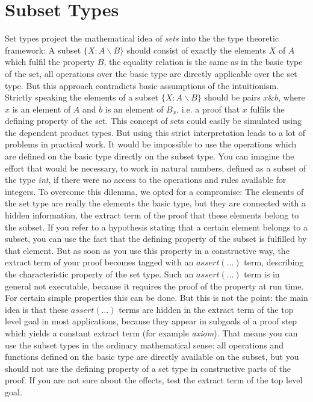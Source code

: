 \documentclass[11pt]{report}
\newcommand{\inv}[1]{\index{#1}}
\begin{document}
 \section{Subset Types}
 \inv{subset type}
  
 Set types project the mathematical idea of \emph{sets} into the
 the type theoretic framework: A subset $\{X:A\backslash B\}$ 
 should consist of exactly the elements $X$ of $A$ which
 fulfil the property $B$, the equality relation is the same as in
 the basic type of the set, all operations over the basic type are
 directly applicable over the set type.
 But this approach contradicts basic assumptions of the 
 intuitionism. 
 Strictly speaking the elements of a subset 
 $\{X:A\backslash B\}$ should be pairs $x\&b$, where $x$ is an
 element of $A$ and $b$ is an element of $B_x$, i.e. a proof
 that $x$ fulfils the defining property of the set.
 This concept of sets could easily be simulated using the
 dependent product types.
 But using this strict interpretation leads to a lot of problems
 in practical work. It would be impossible to use the
 operations which are defined on the basic type directly on the
 subset type. You can imagine the effort that would be necessary,
 to work in natural numbers, defined as a subset of the type \emph{int},
 if there were no access to the operations and rules 
 available for integers. 
 To overcome this dilemma, we opted for a compromise:
 The elements of the set type are really the elements the
 basic type, but they are connected with a hidden information,
 the extract term of the proof that these elements belong to  
 the subset. If you refer to a hypothesis stating that a
 certain element belongs to a subset, you can use the fact that
 the defining property of the subset is fulfilled by that
 element. But as soon as you use this property in a constructive
 way, the extract term of your proof becomes tagged with an
 $assert(...)$ term, describing the characteristic property
 of the set type. Such an $assert(...)$ term is in general
 not executable, because it requires the proof of the property
 at run time. For certain simple properties this can be done.
 But this is not the point: the main idea is that 
 these $assert(...)$ terms are hidden in the
 extract term of the top level goal in most applications, because
 they appear in subgoals of a proof step which yields a constant
 extract term (for example \emph{axiom}).
 That means you can use the subset types in the ordinary mathematical
 sense: all operations and functions defined on the basic type
 are directly available on the subset, but you should not use the
 defining property of a set type in constructive parts of the
 proof. If you are not sure about the effects, test the
 extract term of the top level goal. 
  
\end{document}

